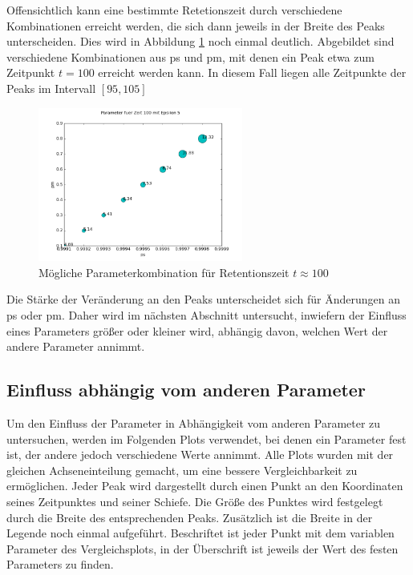 Offensichtlich kann eine bestimmte Retetionszeit durch verschiedene Kombinationen erreicht werden, die sich dann jeweils in der Breite des Peaks unterscheiden. Dies wird in Abbildung \ref{params_at_time} noch einmal deutlich. Abgebildet sind verschiedene Kombinationen aus ps und pm, mit denen ein Peak etwa zum Zeitpunkt $t=100$ erreicht werden kann. In diesem Fall liegen alle Zeitpunkte der Peaks im Intervall $[95, 105]$

\begin{figure}[h]
\centering
\includegraphics[width=0.6\textwidth]{bilder/paramsfuert100}
\caption{Mögliche Parameterkombination für Retentionszeit $t \approx 100$}
\label{params_at_time}
\end{figure}




Die Stärke der Veränderung an den Peaks unterscheidet sich für Änderungen an ps oder pm. Daher wird im nächsten Abschnitt untersucht, inwiefern der Einfluss eines Parameters größer oder kleiner wird, abhängig davon, welchen Wert der andere Parameter annimmt.

\subsection{Einfluss abhängig vom anderen Parameter}

Um den Einfluss der Parameter in Abhängigkeit vom anderen Parameter zu untersuchen, werden im Folgenden Plots verwendet, bei denen ein Parameter fest ist, der andere jedoch verschiedene Werte annimmt. Alle Plots wurden mit der gleichen Achseneinteilung gemacht, um eine bessere Vergleichbarkeit zu ermöglichen. Jeder Peak wird dargestellt durch einen Punkt an den Koordinaten seines Zeitpunktes und seiner Schiefe. Die Größe des Punktes wird festgelegt durch die Breite des entsprechenden Peaks. Zusätzlich ist die Breite in der Legende noch einmal aufgeführt. Beschriftet ist jeder Punkt mit dem variablen Parameter des Vergleichsplots, in der Überschrift ist jeweils der Wert des festen Parameters zu finden.


